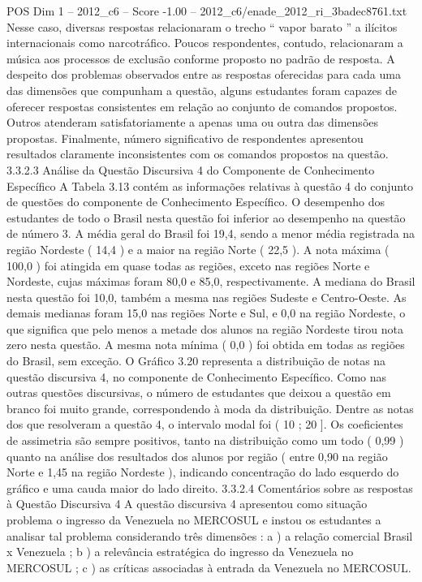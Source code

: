 \begin{textsample}{POS Dim 1 – 2012\_c6 – Score -1.00 – 2012\_c6/enade\_2012\_ri\_3badec8761.txt}
Nesse caso, diversas respostas relacionaram o trecho “ vapor barato ” a ilícitos internacionais como narcotráfico.
Poucos respondentes, contudo, relacionaram a música aos processos de exclusão conforme proposto no padrão de resposta.
A despeito dos problemas observados entre as respostas oferecidas para cada uma das dimensões que compunham a questão, alguns estudantes foram capazes de oferecer respostas consistentes em relação ao conjunto de comandos propostos.
Outros atenderam satisfatoriamente a apenas uma ou outra das dimensões propostas.
Finalmente, número significativo de respondentes apresentou resultados claramente inconsistentes com os comandos propostos na questão. 3.3.2.3 Análise da Questão Discursiva 4 do Componente de Conhecimento Específico A Tabela 3.13 contém as informações relativas à questão 4 do conjunto de questões do componente de Conhecimento Específico.
O desempenho dos estudantes de todo o Brasil nesta questão foi inferior ao desempenho na questão de número 3.
A média geral do Brasil foi 19,4, sendo a menor média registrada na região Nordeste ( 14,4 ) e a maior na região Norte ( 22,5 ).
A nota máxima ( 100,0 ) foi atingida em quase todas as regiões, exceto nas regiões Norte e Nordeste, cujas máximas foram 80,0 e 85,0, respectivamente.
A mediana do Brasil nesta questão foi 10,0, também a mesma nas regiões Sudeste e Centro-Oeste.
As demais medianas foram 15,0 nas regiões Norte e Sul, e 0,0 na região Nordeste, o que significa que pelo menos a metade dos alunos na região Nordeste tirou nota zero nesta questão.
A mesma nota mínima ( 0,0 ) foi obtida em todas as regiões do Brasil, sem exceção.
O Gráfico 3.20 representa a distribuição de notas na questão discursiva 4, no componente de Conhecimento Específico.
Como nas outras questões discursivas, o número de estudantes que deixou a questão em branco foi muito grande, correspondendo à moda da distribuição.
Dentre as notas dos que resolveram a questão 4, o intervalo modal foi ( 10 ; 20 ].
Os coeficientes de assimetria são sempre positivos, tanto na distribuição como um todo ( 0,99 ) quanto na análise dos resultados dos alunos por região ( entre 0,90 na região Norte e 1,45 na região Nordeste ), indicando concentração do lado esquerdo do gráfico e uma cauda maior do lado direito. 3.3.2.4 Comentários sobre as respostas à Questão Discursiva 4 A questão discursiva 4 apresentou como situação problema o ingresso da Venezuela no MERCOSUL e instou os estudantes a analisar tal problema considerando três dimensões : a ) a relação comercial Brasil x Venezuela ; b ) a relevância estratégica do ingresso da Venezuela no MERCOSUL ; c ) as críticas associadas à entrada da Venezuela no MERCOSUL.

\end{textsample}
